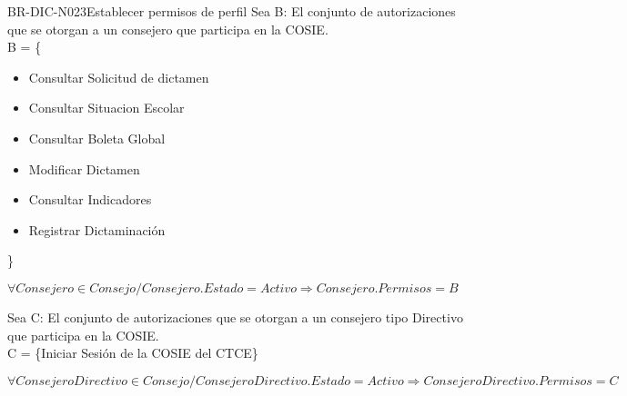 \begin{BusinessRule}{BR-DIC-N023}{Establecer permisos de perfil}
	Sea B: El conjunto de autorizaciones que se otorgan a un consejero que participa en la COSIE. \\ 
	 B = \{ \begin{itemize} 
	 \item Consultar Solicitud de dictamen
	 \item Consultar Situacion Escolar
	 \item Consultar Boleta Global
	 \item Modificar Dictamen
	 \item Consultar Indicadores
	 \item Registrar Dictaminación
	  \end{itemize}\}
	\begin{center}
	$ \forall Consejero \in Consejo / Consejero.Estado = Activo \Rightarrow Consejero.Permisos = B$
	\end{center}
	Sea C: El conjunto de autorizaciones que se otorgan a un consejero tipo Directivo que participa en la COSIE. \\ 
	 C = \{Iniciar Sesión de la COSIE del CTCE\}
	\begin{center}
	$ \forall ConsejeroDirectivo \in Consejo / ConsejeroDirectivo.Estado = Activo \Rightarrow ConsejeroDirectivo.Permisos = C$
	
	\end{center}
\end{BusinessRule}

